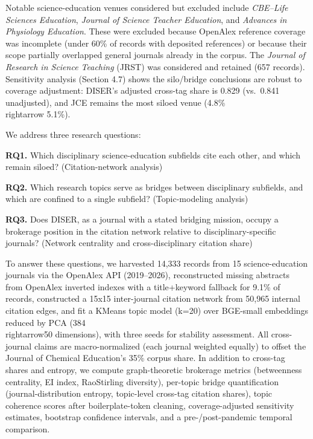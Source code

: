 \documentclass[pdflatex,sn-apa]{sn-jnl}
\begin{document}
Notable science-education venues considered but excluded include
\emph{CBE--Life Sciences Education}, \emph{Journal of Science Teacher
Education}, and \emph{Advances in Physiology Education}. These were
excluded because OpenAlex reference coverage was incomplete (under 60\%
of records with deposited references) or because their scope partially
overlapped general journals already in the corpus. The \emph{Journal of
Research in Science Teaching} (JRST) was considered and retained (657
records). Sensitivity analysis (Section 4.7) shows the silo/bridge
conclusions are robust to coverage adjustment: DISER's adjusted
cross-tag share is 0.829 (vs.~0.841 unadjusted), and JCE remains the
most siloed venue (4.8\% \\rightarrow 5.1\%).

We address three research questions:

\textbf{RQ1.} Which disciplinary science-education subfields cite each
other, and which remain siloed? (Citation-network analysis)

\textbf{RQ2.} Which research topics serve as bridges between
disciplinary subfields, and which are confined to a single subfield?
(Topic-modeling analysis)

\textbf{RQ3.} Does DISER, as a journal with a stated bridging mission,
occupy a brokerage position in the citation network relative to
disciplinary-specific journals? (Network centrality and
cross-disciplinary citation share)

To answer these questions, we harvested 14,333 records from 15
science-education journals via the OpenAlex API (2019--2026),
reconstructed missing abstracts from OpenAlex inverted indexes with a
title+keyword fallback for 9.1\% of records, constructed a 15x15
inter-journal citation network from 50,965 internal citation edges, and
fit a KMeans topic model (k=20) over BGE-small embeddings reduced by PCA
(384\\rightarrow50 dimensions), with three seeds for stability assessment. All
cross-journal claims are macro-normalized (each journal weighted
equally) to offset the Journal of Chemical Education's 35\% corpus
share. In addition to cross-tag shares and entropy, we compute
graph-theoretic brokerage metrics (betweenness centrality, EI index,
RaoStirling diversity), per-topic bridge quantification
(journal-distribution entropy, topic-level cross-tag citation shares),
topic coherence scores after boilerplate-token cleaning,
coverage-adjusted sensitivity estimates, bootstrap confidence intervals,
and a pre-/post-pandemic temporal comparison.
\end{document}
